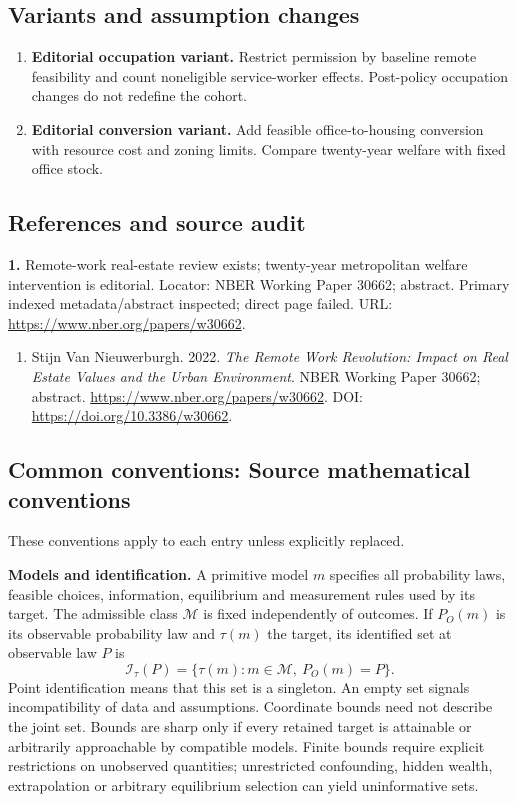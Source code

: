 \documentclass[11pt,a4paper]{article}
\begin{document}
\subsection*{Variants and assumption changes}
\begin{enumerate}
\item \textbf{Editorial occupation variant.} Restrict permission by baseline remote feasibility and count noneligible service-worker effects. Post-policy occupation changes do not redefine the cohort.
\item \textbf{Editorial conversion variant.} Add feasible office-to-housing conversion with resource cost and zoning limits. Compare twenty-year welfare with fixed office stock.
\end{enumerate}
\subsection*{References and source audit}
\textbf{1.} Remote-work real-estate review exists; twenty-year metropolitan welfare intervention is editorial. Locator: NBER Working Paper 30662; abstract. Primary indexed metadata/abstract inspected; direct page failed. URL: \url{https://www.nber.org/papers/w30662}.
\begin{enumerate}\raggedright
\item\hypertarget{definitions:source:30007750:1}{} Stijn Van Nieuwerburgh. 2022. \emph{The Remote Work Revolution: Impact on Real Estate Values and the Urban Environment}. NBER Working Paper 30662; abstract.
\url{https://www.nber.org/papers/w30662}.
DOI: \url{https://doi.org/10.3386/w30662}.
\end{enumerate}

\subsection*{Common conventions: Source mathematical conventions}

These conventions apply to each entry unless explicitly replaced.

\textbf{Models and identification.} A primitive model \(m\) specifies all probability laws, feasible choices, information, equilibrium and measurement rules used by its target. The admissible class \(\mathcal M\) is fixed independently of outcomes. If \(P_O(m)\) is its observable probability law and \(\tau(m)\) the target, its identified set at observable law \(P\) is
\[
 \mathcal I_\tau(P)=\{\tau(m):m\in\mathcal M,\ P_O(m)=P\}.
\]
Point identification means that this set is a singleton. An empty set signals incompatibility of data and assumptions. Coordinate bounds need not describe the joint set. Bounds are sharp only if every retained target is attainable or arbitrarily approachable by compatible models. Finite bounds require explicit restrictions on unobserved quantities; unrestricted confounding, hidden wealth, extrapolation or arbitrary equilibrium selection can yield uninformative sets.
\end{document}

